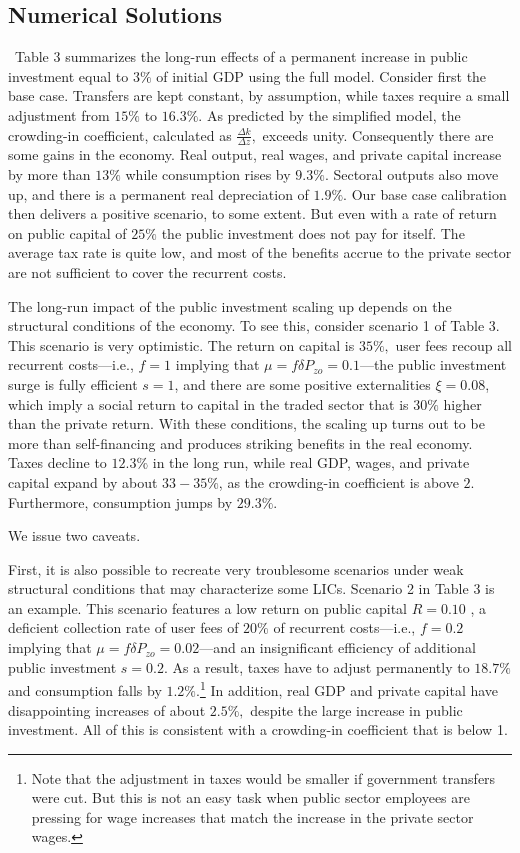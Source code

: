 \documentclass[11pt]{article}
\begin{document}
\subsection{Numerical Solutions}

\quad\ \thinspace Table 3 summarizes the long-run effects of a permanent
increase in public investment equal to $3\%$ of initial GDP using the full
model. Consider first the base case. Transfers are kept constant, by
assumption, while taxes require a small adjustment from $15\%$ to $16.3\%$.
As predicted by the simplified model, the crowding-in coefficient,
calculated as $\frac{\Delta k}{\Delta z},$ exceeds unity. Consequently there
are some gains in the economy. Real output, real wages, and private capital
increase by more than $13\%$ while consumption rises by $9.3\%$. Sectoral
outputs also move up, and there is a permanent real depreciation of $1.9\%$.
Our base case calibration then delivers a positive scenario, to some extent.
But even with a rate of return on public capital of $25\%$ the public
investment does not pay for itself. The average tax rate is quite low, and
most of the benefits accrue to the private sector are not sufficient to
cover the recurrent costs.

The long-run impact of the public investment scaling up depends on the
structural conditions of the economy. To see this, consider scenario 1 of
Table 3. This scenario is very optimistic. The return on capital is $35\%,$
user fees recoup all recurrent costs---i.e., $f=1$ implying that $\mu
=f\delta P_{zo}=0.1$---the public investment surge is fully efficient $s=1$,
and there are some positive externalities $\xi =0.08$, which imply a social
return to capital in the traded sector that is $30\%$ higher than the
private return. With these conditions, the scaling up turns out to be more
than self-financing and produces striking benefits in the real economy.
Taxes decline to $12.3\%$ in the long run, while real GDP, wages, and
private capital expand by about $33-35\%$, as the crowding-in coefficient is
above $2.$ Furthermore, consumption jumps by $29.3\%$.

We issue two caveats.

First, it is also possible to recreate very troublesome scenarios under weak
structural conditions that may characterize some LICs. Scenario 2 in Table 3
is an example. This scenario features a low return on public capital $R=0.10$%
, a deficient collection rate of user fees of $20\%$ of recurrent
costs---i.e., $f=0.2$ implying that $\mu =f\delta P_{zo}=0.02$---and an
insignificant efficiency of additional public investment $s=0.2$. As a
result, taxes have to adjust permanently to $18.7\%$ and consumption falls
by $1.2\%$.\footnote{%
Note that the adjustment in taxes would be smaller if government transfers
were cut. But this is not an easy task when public sector employees are
pressing for wage increases that match the increase in the private sector
wages.} In addition, real GDP and private capital have disappointing
increases of about $2.5\%,$ despite the large increase in public investment.
All of this is consistent with a crowding-in coefficient that is below 1.
\end{document}
